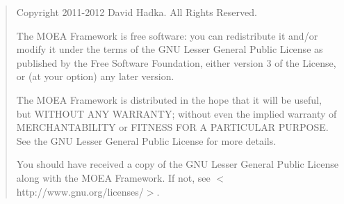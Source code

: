\begin{quotation}
\noindent
Copyright 2011-2012 David Hadka.  All Rights Reserved.

\vspace{1em}
\noindent
The MOEA Framework is free software: you can redistribute it and/or modify
it under the terms of the GNU Lesser General Public License as published by 
the Free Software Foundation, either version 3 of the License, or (at your 
option) any later version.

\vspace{1em}
\noindent
The MOEA Framework is distributed in the hope that it will be useful, but 
WITHOUT ANY WARRANTY; without even the implied warranty of MERCHANTABILITY 
or FITNESS FOR A PARTICULAR PURPOSE.  See the GNU Lesser General Public 
License for more details.

\vspace{1em}
\noindent
You should have received a copy of the GNU Lesser General Public License 
along with the MOEA Framework.  If not, see $<$http://www.gnu.org/licenses/$>$.
\end{quotation}
